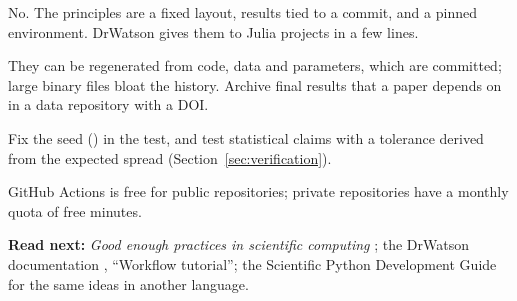 \begin{qa}
No. The principles are a fixed layout, results tied to a commit, and a pinned
environment. DrWatson gives them to Julia projects in a few lines.

They can be regenerated from code, data and parameters, which are committed; large
binary files bloat the history. Archive final results that a paper depends on in a data
repository with a DOI.

Fix the seed () in the test, and test statistical claims with a
tolerance derived from the expected spread (Section~\ref{sec:verification}).

GitHub Actions is free for public repositories; private repositories have a monthly
quota of free minutes.
\end{qa}

\textbf{Read next:} \emph{Good enough practices in scientific computing} ;
the DrWatson documentation , ``Workflow tutorial''; the Scientific
Python Development Guide  for the same ideas in another language.
